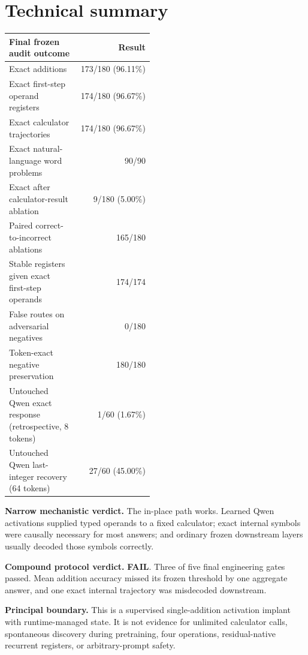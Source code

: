 \documentclass[11pt]{article}
\newcommand{\fail}{\textcolor{failred}{\textbf{FAIL}}}
\begin{document}
\section*{Technical summary}

\begin{center}
\small
\begin{tabular}{p{0.48\linewidth}r}
\toprule
Final frozen audit outcome & Result\\
\midrule
Exact additions & 173/180 (96.11\%)\\
Exact first-step operand registers & 174/180 (96.67\%)\\
Exact calculator trajectories & 174/180 (96.67\%)\\
Exact natural-language word problems & 90/90\\
Exact after calculator-result ablation & 9/180 (5.00\%)\\
Paired correct-to-incorrect ablations & 165/180\\
Stable registers given exact first-step operands & 174/174\\
False routes on adversarial negatives & 0/180\\
Token-exact negative preservation & 180/180\\
\midrule
Untouched Qwen exact response (retrospective, 8 tokens) & 1/60 (1.67\%)\\
Untouched Qwen last-integer recovery (64 tokens) & 27/60 (45.00\%)\\
\bottomrule
\end{tabular}
\end{center}

\noindent\textbf{Narrow mechanistic verdict.}
The in-place path works. Learned Qwen activations supplied typed operands to a
fixed calculator; exact internal symbols were causally necessary for most
answers; and ordinary frozen downstream layers usually decoded those symbols
correctly.

\medskip
\noindent\textbf{Compound protocol verdict.}
\fail. Three of five final engineering gates passed. Mean addition accuracy
missed its frozen threshold by one aggregate answer, and one exact internal
trajectory was misdecoded downstream.

\medskip
\noindent\textbf{Principal boundary.}
This is a supervised single-addition activation implant with runtime-managed
state. It is not evidence for unlimited calculator calls, spontaneous
discovery during pretraining, four operations, residual-native recurrent
registers, or arbitrary-prompt safety.
\end{document}
